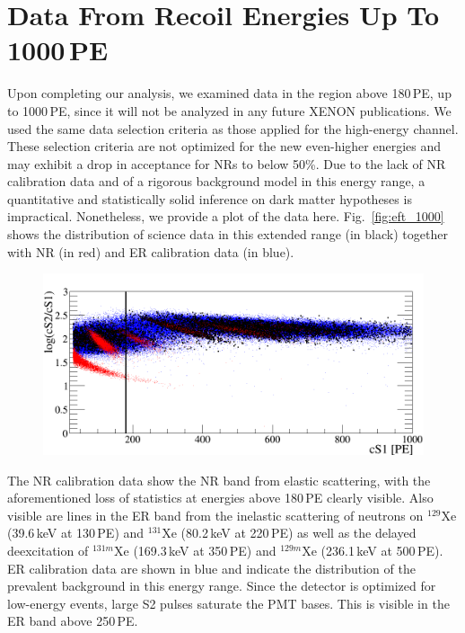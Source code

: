 \section{Data From Recoil Energies Up To 1000\,PE}
\label{sec:SuperHighE}
Upon completing our analysis, we examined data in the \cSi{} region above 180\,PE, up to 1000\,PE, since it will not be analyzed in any future XENON publications. We used the same data selection criteria as those applied for the high-energy channel. These selection criteria are not optimized for the new even-higher energies and may exhibit a drop in acceptance for NRs to below 50\%. Due to the lack of NR calibration data and of a rigorous background model in this energy range, a quantitative and statistically solid inference on dark matter hypotheses is impractical. Nonetheless, we provide a plot of the data here. Fig.~\ref{fig:eft_1000} shows the distribution of science data in this extended range (in black) together with NR (in red) and ER calibration data (in blue).

\begin{figure}
\centerline{\includegraphics[width=1.\linewidth]{fig/superhighE.png}}
\end{figure}  

The NR calibration data show the NR band from elastic scattering, with the aforementioned loss of statistics at energies above 180\,PE clearly visible. Also visible are lines in the ER band from the inelastic scattering of neutrons on $^{129}$Xe (39.6\,keV at 130\,PE) and $^{131}$Xe (80.2\,keV at 220\,PE) as well as the delayed deexcitation of $^{131m}$Xe (169.3\,keV at 350\,PE) and $^{129m}$Xe (236.1\,keV at 500\,PE). ER calibration data are shown in blue and indicate the distribution of the prevalent background in this energy range. Since the detector is optimized for low-energy events, large S2 pulses saturate the PMT bases. This is visible in the ER band above 250\,PE.

